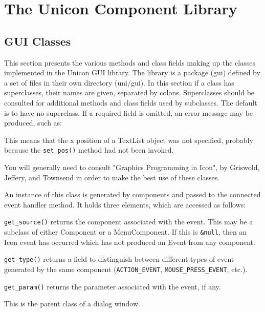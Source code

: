 \chapter{The Unicon Component Library}

\section{GUI Classes}

This section presents the various methods and class fields making up the
classes implemented in the Unicon GUI library. The library is a package
(gui) defined by a set of files in their own directory (uni/gui). In
this section if a class has superclasses, their names are given,
separated by colons. Superclasses should be consulted for additional
methods and class fields used by subclasses. The
default is to have no superclass.
If a required field is omitted, an error message may be produced,
such as:


\noindent This means that the x position of a TextList object was not specified,
probably because the \texttt{set\_pos()} method had not been invoked.

You will generally need to consult
"Graphics Programming in Icon", by
Griswold, Jeffery, and Townsend
in order to make the best use of these classes.


An instance of this class is generated by components and passed to the
connected event handler method. It holds three elements, which
are accessed as follows:

\noindent\texttt{get\_source()} returns the component associated with the event. This may
be a subclass of either Component or a MenuComponent. If this is
\texttt{\&null}, then an Icon event has occurred which has not produced an Event
from any component.

\noindent\texttt{get\_type()} returns a field to distinguish between different types of
event generated by the same component (\texttt{ACTION\_EVENT},
\texttt{MOUSE\_PRESS\_EVENT}, etc.).

\noindent\texttt{get\_param()} returns the parameter associated with the event, if any.


This is the parent class of a dialog window.

